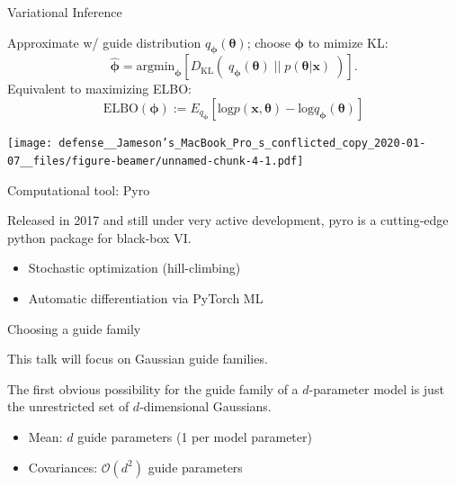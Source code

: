 \documentclass[
  ignorenonframetext,
]{beamer}
\providecommand{\tightlist}{%
  \setlength{\itemsep}{0pt}\setlength{\parskip}{0pt}}
\begin{document}
\begin{frame}{Variational Inference}
\protect\hypertarget{variational-inference}{}

Approximate w/ guide distribution \(q_{\bm{\phi}}(\bm{\theta})\); choose
\(\bm{\phi}\) to mimize KL:
\[\hat{{\bm{\phi}}}=\mathrm{argmin}_{\bm{\phi}}\left[D_{\mathrm{KL}} \left(\;q_{\bm{\phi}}(\bm{\theta})\;\big|\big|\; p(\bm{\theta}|\bm{x})\;\right)\right].\]
Equivalent to maximizing ELBO:
\[\mathrm{ELBO}({\bm{\phi}}):=E_{q_{\bm{\phi}}}
\left[\mathrm{log} p(\bm{x},\bm{\theta})-\mathrm{log} q_{\bm{\phi}}(\bm{\theta})\right]\]

\texttt{[image: defense\_\_Jameson’s\_MacBook\_Pro\_s\_conflicted\_copy\_2020-01-07\_\_files/figure-beamer/unnamed-chunk-4-1.pdf]}

\end{frame}

\begin{frame}{Computational tool: Pyro}
\protect\hypertarget{computational-tool-pyro}{}

Released in 2017 and still under very active development, pyro is a
cutting-edge python package for black-box VI.

\begin{itemize}
\tightlist
\item
  Stochastic optimization (hill-climbing)
\item
  Automatic differentiation via PyTorch ML
\end{itemize}

\end{frame}

\begin{frame}{Choosing a guide family}
\protect\hypertarget{choosing-a-guide-family}{}

This talk will focus on Gaussian guide families.

The first obvious possibility for the guide family of a \(d\)-parameter
model is just the unrestricted set of \(d\)-dimensional Gaussians.

\begin{itemize}
\tightlist
\item
  Mean: \(d\) guide parameters (1 per model parameter)
\item
  Covariances: \(\mathcal{O}(d^2)\) guide parameters
\end{itemize}

\end{frame}
\end{document}
